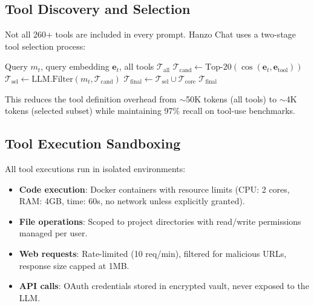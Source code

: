 \subsection{Tool Discovery and Selection}

Not all 260+ tools are included in every prompt. Hanzo Chat uses a two-stage tool selection process:

\begin{algorithm}[H]
\caption{Dynamic Tool Selection}
\label{alg:tools}
\begin{algorithmic}[1]
\Require Query $m_t$, query embedding $\bm{e}_t$, all tools $\mathcal{T}_{\text{all}}$
\State {}
\State $\mathcal{T}_{\text{cand}} \gets \text{Top-}20(\cos(\bm{e}_t, \bm{e}_{\text{tool}}))$
\State {}
\State $\mathcal{T}_{\text{sel}} \gets \text{LLM.Filter}(m_t, \mathcal{T}_{\text{cand}})$
\State {}
\State $\mathcal{T}_{\text{final}} \gets \mathcal{T}_{\text{sel}} \cup \mathcal{T}_{\text{core}}$
\State \Return $\mathcal{T}_{\text{final}}$ 
\end{algorithmic}
\end{algorithm}

This reduces the tool definition overhead from $\sim$50K tokens (all tools) to $\sim$4K tokens (selected subset) while maintaining 97\% recall on tool-use benchmarks.

\subsection{Tool Execution Sandboxing}

All tool executions run in isolated environments:

\begin{itemize}[leftmargin=1.1em]
    \item \textbf{Code execution}: Docker containers with resource limits (CPU: 2 cores, RAM: 4GB, time: 60s, no network unless explicitly granted).
    \item \textbf{File operations}: Scoped to project directories with read/write permissions managed per user.
    \item \textbf{Web requests}: Rate-limited (10 req/min), filtered for malicious URLs, response size capped at 1MB.
    \item \textbf{API calls}: OAuth credentials stored in encrypted vault, never exposed to the LLM.
\end{itemize}

